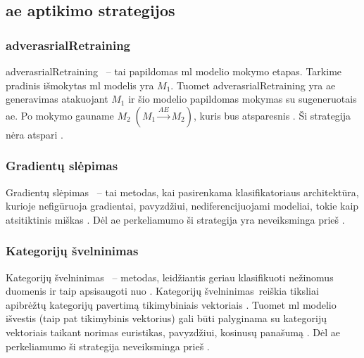 \subsection{\gls*{ae} aptikimo strategijos}\label{sec:literature:defense}

\def\strat{\Gls{adverasrialRetraining}}
\subsubsection{\Gls*{adverasrialRetraining}}\label{sec:literature:defense:retraining}

\strat~ -- tai papildomas \gls{ml} modelio mokymo etapas. Tarkime pradinis išmokytas \gls{ml} modelis yra $M_1$. Tuomet \gls{adverasrialRetraining} yra \gls{ae} generavimas atakuojant $M_1$ ir šio modelio papildomas mokymas su sugeneruotais \gls{ae}. Po mokymo gauname $M_2 \; (M_1 \xrightarrow{AE} M_2)$, kuris bus atsparesnis . Ši strategija nėra atspari  \cite{chakrabortySurveyAdversarialAttacks2021}.



\def\strat{Gradientų slėpimas}
\subsubsection{\strat}

\strat~ -- tai metodas, kai pasirenkama klasifikatoriaus architektūra, kurioje nefigūruoja gradientai, pavyzdžiui, nediferencijuojami modeliai, tokie kaip atsitiktinis miškas . Dėl \gls{ae} perkeliamumo  ši strategija yra neveiksminga prieš  \cite{chakrabortySurveyAdversarialAttacks2021}.



\def\strat{Kategorijų švelninimas}
\subsubsection{\strat}

\strat~ -- metodas, leidžiantis geriau klasifikuoti nežinomus duomenis ir taip apsisaugoti nuo . \strat~reiškia tiksliai apibrėžtų kategorijų  pavertimą tikimybiniais vektoriais . Tuomet \gls{ml} modelio išvestis (taip pat tikimybinis vektorius) gali būti palyginama su kategorijų vektoriais taikant norimas euristikas, pavyzdžiui, kosinusų panašumą . Dėl \gls{ae} perkeliamumo  ši strategija neveiksminga prieš  \cite{chakrabortySurveyAdversarialAttacks2021}.



